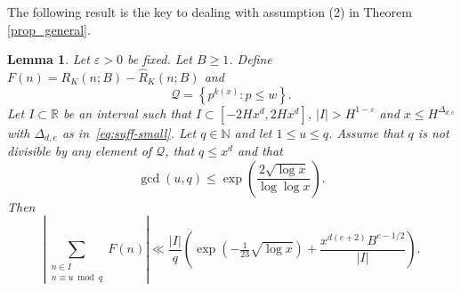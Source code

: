 \documentclass[11pt,letterpaper]{amsart}
\renewcommand{\leq}{\leqslant}
\renewcommand{\geq}{\geqslant}
\newtheorem{lemma}[theorem]{Lemma}
\theoremstyle{definition}
\numberwithin{equation}{section}
\newcommand\RR{\mathbb{R}}
\newcommand\NN{\mathbb{N}}
\newcommand{\ve}{\varepsilon}
\DeclareMathOperator{\n}{N}
\newcommand{\0}{\mathbf{0}}
\begin{document}
The  following result is the key to dealing with assumption  (2) in Theorem 
\ref{prop_general}.

\begin{lemma}\label{lem:for_(2)}
Let $\ve>0$ be fixed. Let $B\geq 1$. Define
$
F(n)= R_K(n;B)-\hat R_K(n;B)
$ 
and
\begin{equation}\label{eq:defQ}
\mathcal{Q}=\left\{p^{k(x)}: p\leq w\right\}.
\end{equation}
Let  $I\subset \RR$ be an interval such that 
$I\subset [-2H x^d, 2 H x^d]$, $|I|>H^{1-\ve}$ and $x\leq H^{\Delta_{d,e}}$ with $\Delta_{d,e}$ as in~\eqref{eq:suff-small}.
Let $q\in \NN$ and let $1\leq u\leq q$. 
Assume that  $q$ is not divisible by any  element of $\mathcal{Q}$, that 
$q\leq x^{d}$ and that 
\begin{equation}\label{eq:window}
\gcd(u,q)\leq \exp \left(\frac{2\sqrt{\log x}}{\log\log x}\right).
\end{equation}
Then
$$
\left|\sum_{\substack{n\in I\\n\equiv u\bmod q}}F(n)\right|
\ll
\frac{|I|}{q} \left(
 \exp\left(-\tfrac{1}{23}\sqrt{\log x} \right) 
+\frac{x^{d(e+2)}B^{e-1/2}}{|I|} \right).
$$
\end{lemma}
\end{document}
